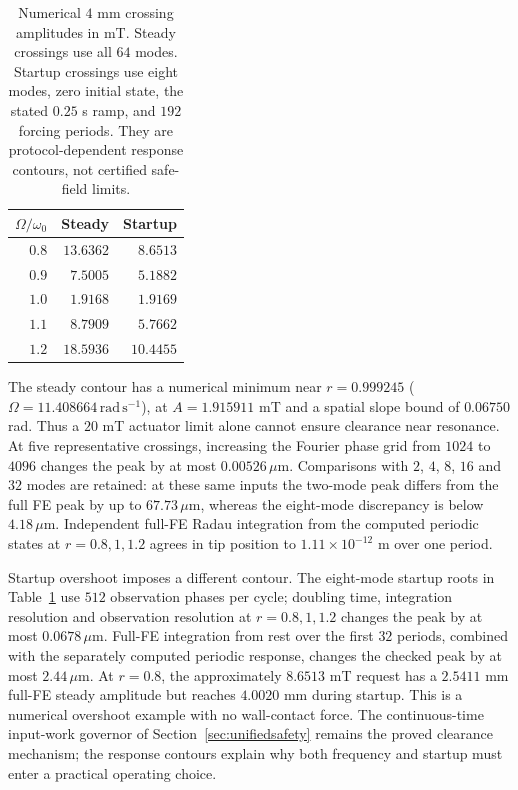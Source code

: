 \begin{table}[t]
\centering\small
\caption{Numerical $4$ mm crossing amplitudes in mT. Steady crossings
use all $64$ modes. Startup crossings use eight modes, zero initial
state, the stated $0.25$ s ramp, and $192$ forcing periods. They are
protocol-dependent response contours, not certified safe-field limits.}
\label{tab:stability-boundaries}
\begin{tabular}{rrr}
\toprule
$\Omega/\omega_0$ & Steady & Startup\\
\midrule
$0.8$ & $13.6362$ & $8.6513$\\
$0.9$ & $7.5005$ & $5.1882$\\
$1.0$ & $1.9168$ & $1.9169$\\
$1.1$ & $8.7909$ & $5.7662$\\
$1.2$ & $18.5936$ & $10.4455$\\
\bottomrule
\end{tabular}
\end{table}

The steady contour has a numerical minimum near
$r=0.999245$ ($\Omega=11.408664\,\mathrm{rad\,s^{-1}}$), at
$A=1.915911$ mT and a spatial slope bound of $0.06750$ rad.
Thus a $20$ mT actuator limit alone cannot ensure clearance near resonance.
At five representative crossings, increasing the Fourier phase grid
from $1024$ to $4096$ changes the peak by at most $0.00526\,\mu$m.
Comparisons with $2$, $4$, $8$, $16$ and $32$ modes are retained:
at these same inputs the two-mode peak differs from the full FE peak
by up to $67.73\,\mu$m, whereas the eight-mode discrepancy is below
$4.18\,\mu$m. Independent full-FE Radau integration from the computed
periodic states at $r=0.8,1,1.2$ agrees in tip position to
$1.11\times10^{-12}$ m over one period.

Startup overshoot imposes a different contour. The eight-mode startup
roots in Table~\ref{tab:stability-boundaries} use $512$ observation
phases per cycle; doubling time, integration resolution and observation
resolution at $r=0.8,1,1.2$ changes the peak by at most
$0.0678\,\mu$m. Full-FE integration from rest over the first $32$
periods, combined with the separately computed periodic response,
changes the checked peak by at most $2.44\,\mu$m. At $r=0.8$, the
approximately $8.6513$ mT request has a $2.5411$ mm full-FE steady
amplitude but reaches $4.0020$ mm during startup. This is a numerical
overshoot example with no wall-contact force. The continuous-time
input-work governor of Section~\ref{sec:unifiedsafety} remains the
proved clearance mechanism; the response contours explain why both
frequency and startup must enter a practical operating choice.

